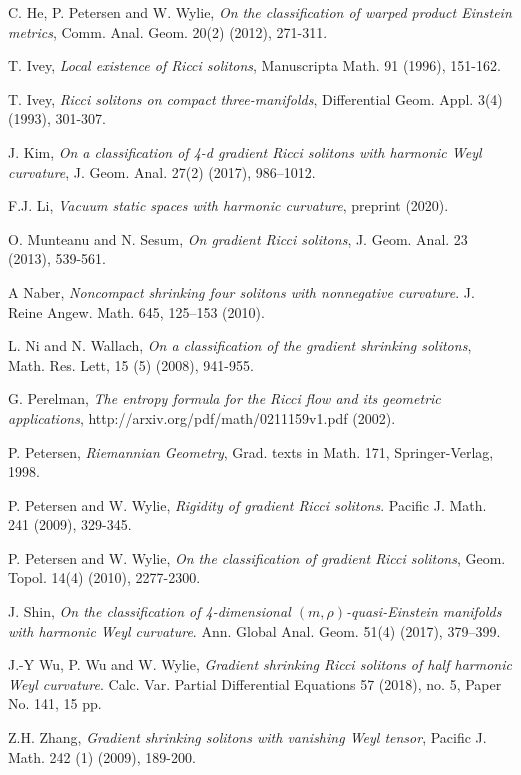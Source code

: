 \documentclass{amsart}
\theoremstyle{definition}
\theoremstyle{remark}
\numberwithin{equation}{section}
\begin{document}
\begin{thebibliography}{30}
		 C. He, P. Petersen and W. Wylie, {\em On the classification of warped product Einstein metrics},
			Comm. Anal. Geom. 20(2) (2012), 271-311.
		
		 T. Ivey, {\em Local existence of Ricci solitons}, Manuscripta Math. 91 (1996), 151-162.
		
		 T. Ivey, {\em Ricci solitons on compact three-manifolds}, Differential Geom. Appl. 3(4) (1993), 301-307.
		
		 J. Kim, {\em On a classification of 4-d gradient Ricci solitons with harmonic Weyl curvature}, J. Geom. Anal. 27(2) (2017), 986–1012. 

        F.J. Li, {\em  Vacuum static spaces with harmonic curvature}, preprint (2020).

		 O. Munteanu and N. Sesum, {\em On gradient Ricci solitons}, J. Geom. Anal. 23 (2013), 539-561.

      A Naber, {\em Noncompact shrinking four solitons with nonnegative curvature}. J. Reine Angew. Math. 645, 125–153 (2010).  
		
		 L. Ni and N. Wallach, {\em On a classification of the gradient shrinking solitons}, Math. Res. Lett,
		15 (5) (2008), 941-955.
	
		 G. Perelman, {\em The entropy formula for the Ricci flow and its geometric applications}, http://arxiv.org/pdf/math/0211159v1.pdf  (2002).
		
		 P. Petersen, {\em Riemannian Geometry}, Grad. texts in Math. 171, Springer-Verlag, 1998.
		
		 P. Petersen and W. Wylie, {\em Rigidity of gradient Ricci solitons}. Pacific J. Math. 241 (2009), 329-345.
		
		  P. Petersen and W. Wylie, {\em On the classification of gradient Ricci solitons}, Geom. Topol. 14(4) (2010), 2277-2300.
				
	    J. Shin, {\em On the classification of 4-dimensional $(m,\rho)$-quasi-Einstein manifolds with harmonic Weyl curvature}. Ann. Global Anal. Geom. 51(4) (2017), 379–399.

    J.-Y Wu, P. Wu and W. Wylie, {\em  Gradient shrinking Ricci solitons of half harmonic Weyl curvature}. Calc. Var. Partial Differential Equations 57 (2018), no. 5, Paper No. 141, 15 pp.
		
		 Z.H. Zhang, {\em Gradient shrinking solitons with vanishing Weyl tensor}, Pacific J. Math. 242 (1) (2009), 189-200.
	\end{thebibliography}
\end{document}

